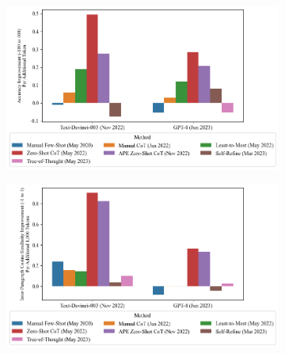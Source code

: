 \documentclass[11pt]{article}
\begin{document}
\begin{figure}
  \caption{Gains Per Token v. Direct Prompting}
  \begin{subfigure}[h]{0.4925\textwidth}
      \centering
      \includegraphics[width=0.95\hsize]{../Output for Report/gsm8k_change_in_accuracy_quality_per_change_in_conversation_length_sorted_by_technique_age.png} 
  \end{subfigure}
  \begin{subfigure}[h]{0.4925\textwidth}
      \centering
      \includegraphics[width=0.95\hsize]{../Output for Report/cw_change_in_accuracy_quality_per_change_in_conversation_length_sorted_by_technique_age_transformed.png}
  \end{subfigure}
  \hfill
  \label{fig:gains_v_dp}
\end{figure}
\end{document}
